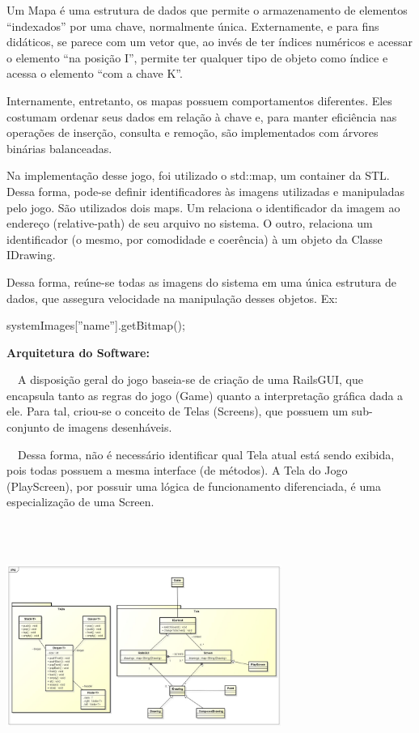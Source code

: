 \documentclass[a4paper]{article}
\begin{document}
{\color{black}
Um Mapa é uma estrutura de dados que permite o armazenamento de
elementos “indexados” por uma chave, normalmente única. Externamente, e
para fins didáticos, se parece com um vetor que, ao invés de ter
índices numéricos e acessar o elemento “na posição I”, permite ter
qualquer tipo de objeto como índice e acessa o elemento “com a chave
K”.}

{\color{black}
Internamente, entretanto, os mapas possuem comportamentos diferentes.
Eles costumam ordenar seus dados em relação à chave e, para manter
eficiência nas operações de inserção, consulta e remoção, são
implementados com árvores binárias balanceadas.}

{\color{black}
Na implementação desse jogo, foi utilizado o std::map, um container da
STL. Dessa forma, pode-se definir identificadores às imagens utilizadas
e manipuladas pelo jogo. São utilizados dois maps. Um relaciona o
identificador da imagem ao endereço (relative-path) de seu arquivo no
sistema. O outro, relaciona um identificador (o mesmo, por comodidade e
coerência) à um objeto da Classe IDrawing.}

{\color{black}
Dessa forma, reúne-se todas as imagens do sistema em uma única estrutura
de dados, que assegura velocidade na manipulação desses objetos. Ex:}

{\color{black}
\textcolor[rgb]{0.8392157,0.6156863,0.52156866}{systemImages[}\textcolor[rgb]{0.3372549,0.6117647,0.8392157}{”name”}\textcolor[rgb]{0.8392157,0.6156863,0.52156866}{].}\textcolor[rgb]{0.3254902,0.5058824,0.20784314}{getBitmap}\textcolor[rgb]{0.8392157,0.6156863,0.52156866}{();}}

{\color{black}
\textbf{Arquitetura do Software: }}

{\color{black}
\ \ A disposição geral do jogo baseia-se de criação de uma RailsGUI, que
encapsula tanto as regras do jogo (Game) quanto a interpretação gráfica
dada a ele. Para tal, criou-se o conceito de Telas (Screens), que
possuem um sub-conjunto de imagens desenháveis.}

{\color{black}
\ \ Dessa forma, não é necessário identificar qual Tela atual está sendo
exibida, pois todas possuem a mesma interface (de métodos). A Tela do
Jogo (PlayScreen), por possuir uma lógica de funcionamento
diferenciada, é uma especialização de uma Screen.}

\begin{center}
\includegraphics[width=3.5417in,height=3.1874in]{Tra1n-img/Tra1n-img11.jpg}
\end{center}
\end{document}
